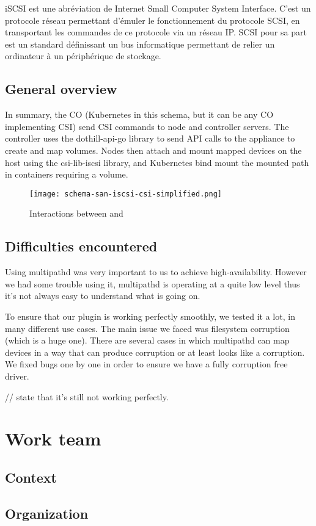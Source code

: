 \color{darkgreen}
iSCSI est une abréviation de Internet Small Computer System Interface. C'est un protocole réseau permettant d'émuler le fonctionnement du protocole SCSI, en transportant les commandes de ce protocole via un réseau IP. SCSI pour sa part est un standard définissant un bus informatique permettant de relier un ordinateur à un périphérique de stockage.
\color{black}

\subsection{General overview}

\color{darkgreen}
In summary, the CO (Kubernetes in this schema, but it can be any CO implementing CSI) send CSI commands to node and controller servers. The controller uses the dothill-api-go library to send API calls to the appliance to create and map volumes. Nodes then attach and mount mapped devices on the host using the csi-lib-iscsi library, and Kubernetes bind mount the mounted path in containers requiring a volume.
\color{black}

\begin{figure}[h]
    \centering
    \texttt{[image: schema-san-iscsi-csi-simplified.png]}
    \caption{Interactions between  and \saniscsicsi}
\end{figure}

\subsection{Difficulties encountered}

\color{darkgreen}
Using multipathd was very important to us to achieve high-availability. However we had some trouble using it, multipathd is operating at a quite low level thus it's not always easy to understand what is going on.

To ensure that our plugin is working perfectly smoothly, we tested it a lot, in many different use cases. The main issue we faced was filesystem corruption (which is a huge one). There are several cases in which multipathd can map devices in a way that can produce corruption or at least looks like a corruption. We fixed bugs one by one in order to ensure we have a fully corruption free driver.

// state that it's still not working perfectly.
\color{black}

\section{Work team}
\subsection{Context}
\subsection{Organization}

\clearpage
